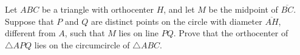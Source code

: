 Let $ABC$ be a triangle with orthocenter $H$, and let $M$ be the midpoint of $\overline{BC}$. Suppose that $P$ and $Q$ are distinct points on the circle with diameter $\overline{AH}$, different from $A$, such that $M$ lies on line $PQ$. Prove that the orthocenter of $\triangle{APQ}$ lies on the circumcircle of $\triangle{ABC}$.